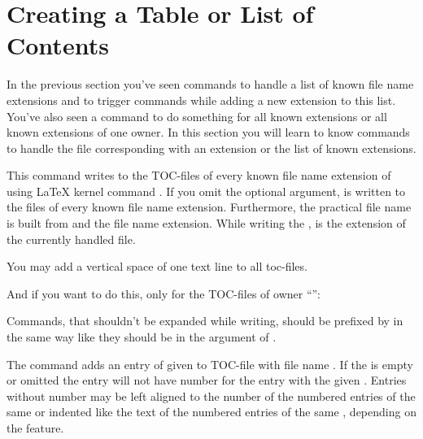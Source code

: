 \section{Creating a Table or List of Contents}
\label{sec:tocbasic.toc}

In the previous section you've seen commands to handle a list of known file
name extensions and to trigger commands while adding a new extension to this
list. You've also seen a command to do something for all known extensions or
all known extensions of one owner. In this section you will learn to know
commands to handle the file corresponding with an extension or the list of
known extensions.

\begin{Declaration}
\end{Declaration}
This command writes  to the TOC-files of every known
file name extension of  using \LaTeX{} kernel command
. If you omit the optional argument,  is
written to the files of every known file name extension. Furthermore, the
practical file name is built from  and the file name
extension. While writing the ,
 is the
extension of the currently handled file.
\begin{Example}
  You may add a vertical space of one text line to all toc-files.
\begin{lstcode}
    \addtoeachtocfile{%
      \protect\addvspace{\protect\baselineskip}%
    }
\end{lstcode}
  And if you want to do this, only for the TOC-files of owner
  ``'':
\begin{lstcode}
    \addtoeachtocfile[foo]{%
      \protect\addvspace{\protect\baselineskip}%
    }
\end{lstcode}
\end{Example}
Commands, that shouldn't be expanded while writing, should be prefixed by
 in the same way like they should be in the argument of
.
\EndIndexGroup


\begin{Declaration}
\end{Declaration}
The command  adds an entry of given  to
TOC-file with file name . If the  is empty
or omitted the entry will not have number for the entry with the given
. Entries without number may be left aligned to the number of the
numbered entries of the same  or indented like the text of the
numbered entries of the same , depending on the
 feature.

